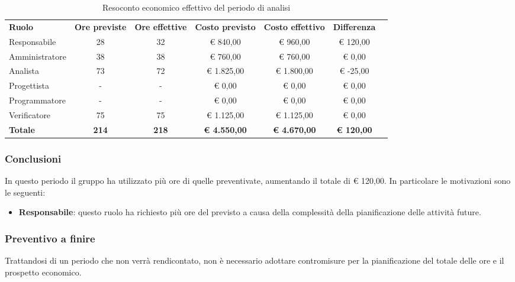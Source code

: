 \documentclass[../piano-di-progetto.tex]{subfiles}
\begin{document}
  \begin{table}[H]
    \centering
    \begin{tabular}{lcccccc}
      \rowcolor{lightgray}
      \textbf{Ruolo}  & \textbf{Ore previste} & \textbf{Ore effettive} & \textbf{Costo previsto} & \textbf{Costo effettivo} & \textbf{Differenza} \\
      Responsabile    & 28                    & 32                     & € 840,00                & € 960,00                 & € 120,00    \\
      Amministratore  & 38                    & 38                     & € 760,00                & € 760,00                 & € 0,00     \\
      Analista        & 73                    & 72                     & € 1.825,00              & € 1.800,00               & € -25,00   \\
      Progettista     & -                     & -                      & € 0,00                  & € 0,00                   & € 0,00     \\
      Programmatore   & -                     & -                      & € 0,00                  & € 0,00                   & € 0,00     \\
      Verificatore    & 75                    & 75                     & € 1.125,00              & € 1.125,00               & € 0,00     \\
      \textbf{Totale} & \textbf{214}          & \textbf{218}           & \textbf{€ 4.550,00}     & \textbf{€ 4.670,00}      & \textbf{€ 120,00}   
      
    \end{tabular}
    \caption{Resoconto economico effettivo del periodo di analisi}
  \end{table}


\subsubsection{Conclusioni}
In questo periodo il gruppo ha utilizzato più ore di quelle preventivate, aumentando il totale di € 120,00. In particolare le motivazioni sono le seguenti:
\begin{itemize}
    \item \textbf{Responsabile}: questo ruolo ha richiesto più ore del previsto a causa della complessità della pianificazione delle attività future.
    \end{itemize}

\subsubsection{Preventivo a finire}
Trattandosi di un periodo che non verrà rendicontato, non è necessario adottare contromisure per la pianificazione del totale delle ore e il prospetto economico.
\end{document}
